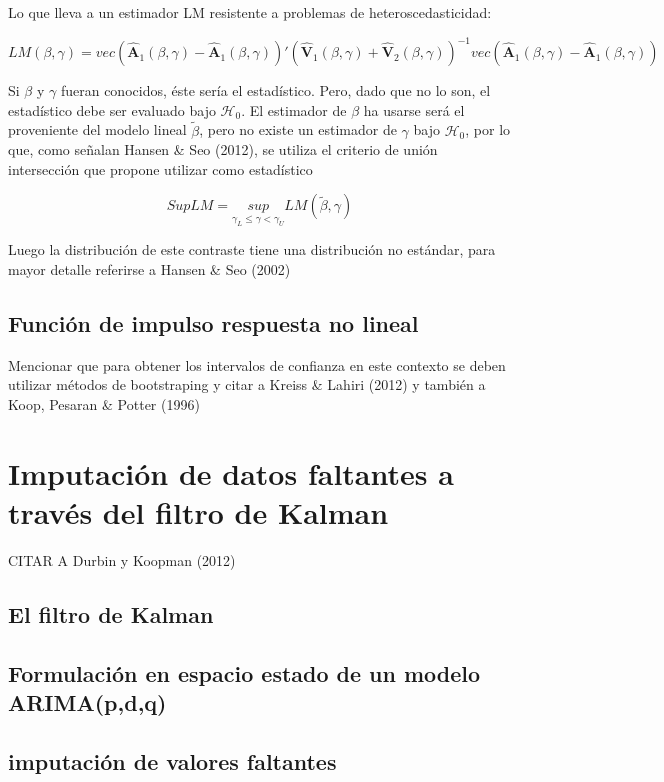 \documentclass[12pt, twoside]{book}\usepackage[]{graphicx}\usepackage[]{color}
\numberwithin{equation}{section}
\numberwithin{theorem}{section}
\numberwithin{teorema}{section}
\numberwithin{defi}{section}
\numberwithin{prop}{section}
\numberwithin{defi}{section}
\theoremstyle{plain}
\begin{document}
Lo que lleva a un estimador LM resistente a problemas de heteroscedasticidad: 

\begin{equation}
LM(\beta,\gamma) = vec(\hat{\mathbf{A}}_{1}(\beta,\gamma)-\hat{\mathbf{A}}_{1}(\beta,\gamma))'(\hat{\mathbf{V}}_{1}(\beta,\gamma)+\hat{\mathbf{V}}_{2}(\beta,\gamma))^{-1}vec(\hat{\mathbf{A}}_{1}(\beta,\gamma)-\hat{\mathbf{A}}_{1}(\beta,\gamma))
\end{equation}

Si $\beta$ y $\gamma$ fueran conocidos, éste sería el estadístico. Pero, dado que no lo son, el estadístico debe ser evaluado bajo $\mathcal{H}_{0}$. El estimador de $\beta$ ha usarse será el proveniente del modelo lineal $\tilde{\beta}$, pero no existe un estimador de $\gamma$ bajo $\mathcal{H}_{0}$, por lo que, como señalan Hansen \& Seo (2012), se utiliza el criterio de unión intersección  que propone utilizar como estadístico

\begin{equation}
SupLM = \underset{\gamma_{L}\leq \gamma <\gamma_{U}}{sup}LM(\tilde{\beta},\gamma)
\end{equation}

Luego la distribución de este contraste tiene una distribución no estándar, para mayor detalle referirse a Hansen \& Seo (2002)

\subsection{Función de impulso respuesta no lineal}

Mencionar que para obtener los intervalos de confianza en este contexto se deben utilizar métodos de bootstraping y citar a Kreiss \& Lahiri (2012) y también a Koop, Pesaran \& Potter (1996)

\section{Imputación de datos faltantes a través del filtro de Kalman}
CITAR A Durbin y Koopman (2012)
\subsection{El filtro de Kalman}
\subsection{Formulación en espacio estado de un modelo ARIMA(p,d,q)}
\subsection{imputación de valores faltantes}
\end{document}

